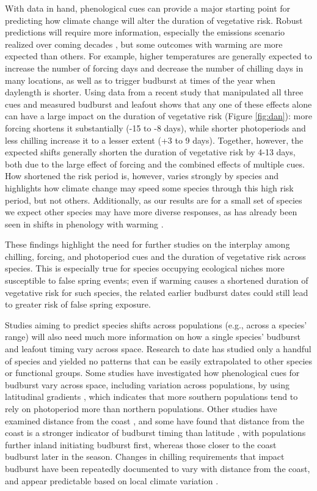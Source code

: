\documentclass{article}\usepackage[]{graphicx}\usepackage[]{color}
\begin{document}
With data in hand, phenological cues can provide a major starting point for predicting how climate change will alter the duration of vegetative risk. Robust predictions will require more information, especially the emissions scenario realized over coming decades \citep{IPCC2014}, but some outcomes with warming are more expected than others. For example, higher temperatures are generally expected to increase the number of forcing days and decrease the number of chilling days in many locations, as well as to trigger budburst at times of the year when daylength is shorter. Using data from a recent study that manipulated all three cues and measured budburst and leafout \citep{Flynn2018} shows that any one of these effects alone can have a large impact on the duration of vegetative risk (Figure \ref{fig:dan}): more forcing shortens it substantially (-15 to -8 days), while shorter photoperiods and less chilling increase it to a lesser extent (+3 to 9 days). Together, however, the expected shifts generally shorten the duration of vegetative risk by 4-13 days, both due to the large effect of forcing and the combined effects of multiple cues. How shortened the risk period is, however, varies strongly by species and highlights how climate change may speed some species through this high risk period, but not others. Additionally, as our results are for a small set of species we expect other species may have more diverse responses, as has already been seen in shifts in phenology with warming \citep{Cleland2006, Fu2015, Xin2016}.

These findings highlight the need for further studies on the interplay among chilling, forcing, and photoperiod cues and the duration of vegetative risk across species. This is especially true for species occupying ecological niches more susceptible to false spring events; even if warming causes a shortened duration of vegetative risk for such species, the related earlier budburst dates could still lead to greater risk of false spring exposure.

Studies aiming to predict species shifts across populations (e.g., across a species' range) will also need much more information on how a single species' budburst and leafout timing vary across space. Research to date has studied only a handful of species and yielded no patterns that can be easily extrapolated to other species or functional groups. Some studies have investigated how phenological cues for budburst vary across space, including variation across populations, by using latitudinal gradients \citep{Gauzere2017, Sogaard2008, Way2015, Zohner2016}, which indicates that more southern populations tend to rely on photoperiod more than northern populations. Other studies have examined distance from the coast \citep[see][]{Aitken2015, Harrington2015, Myking2007}, and some have found that distance from the coast is a stronger indicator of budburst timing than latitude \citep{Myking2007}, with populations further inland initiating budburst first, whereas those closer to the coast budburst later in the season. Changes in chilling requirements that impact budburst have been repeatedly documented to vary with distance from the coast, and appear predictable based on local climate variation \citep{Campbell1979, Howe2003}.  
\end{document}
